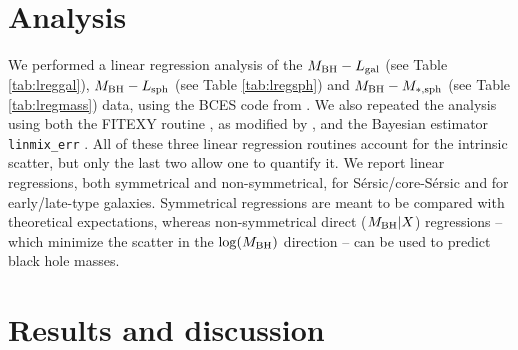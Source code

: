 \documentclass[preprint2]{emulateapj}
\begin{document}


\section{Analysis}
\label{sec:anal}
We performed a linear regression analysis of the $M_{\rm BH} - L_{\rm gal}$ (see Table \ref{tab:lreggal}), 
$M_{\rm BH} - L_{\rm sph}$ (see Table \ref{tab:lregsph}) and $M_{\rm BH} - M_{\rm *,sph}$ (see Table \ref{tab:lregmass}) data,
using the BCES code from \cite{akritasbershady1996}. 
We also repeated the analysis using both the FITEXY routine \citep{press1992}, as modified by \cite{tremaine2002}, 
and the Bayesian estimator {\tt linmix\_err} \citep{linmixerr}. 
All of these three linear regression routines account for the intrinsic scatter, 
but only the last two allow one to quantify it.
We report linear regressions, both symmetrical and non-symmetrical, 
for S\'ersic/core-S\'ersic and for early/late-type galaxies.
Symmetrical regressions are meant to be compared with theoretical expectations, 
whereas non-symmetrical direct ($M_{\rm BH}|X$) regressions -- 
which minimize the scatter in the $\log(M_{\rm BH})$ direction -- 
can be used to predict black hole masses.

\section{Results and discussion}
\label{sec:res}
\end{document}
